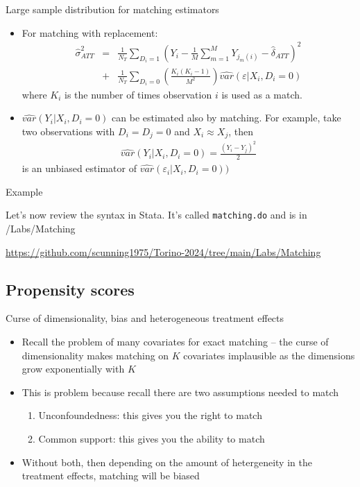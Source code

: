 \documentclass{beamer}
\begin{document}
\begin{frame}{Large sample distribution for matching estimators}
	
	\begin{itemize}
	\item For matching with replacement:
		\begin{eqnarray*}
		\widehat{\sigma}^2_{ATT} &=& \frac{1}{N_T} \sum_{D_i=1} \left( Y_i - \frac{1}{M} \sum_{m=1}^M Y_{j_m(i)} - \widehat{\delta}_{ATT} \right)^2 \\
		&+& \frac{1}{N_T} \sum_{D_i=0} \left( \frac{K_i(K_i-1)}{M^2} \right) \widehat{var}(\varepsilon | X_i,D_i=0)
		\end{eqnarray*}where $K_i$ is the number of times observation $i$ is used as a match.
	\item $\widehat{var}(Y_i | X_i,D_i=0)$ can be estimated also by matching.  For example, take two observations with $D_i=D_j=0$ and $X_i \approx X_j$, then
		\begin{eqnarray*}
		\widehat{var}(Y_i | X_i,D_i=0) = \frac{(Y_i-Y_j)^2}{2}
		\end{eqnarray*}is an unbiased estimator of $\widehat{var}(\varepsilon_i | X_i,D_i=0))$
	\end{itemize}
\end{frame}

\begin{frame}{Example}

Let's now review the syntax in Stata.  It's called \texttt{matching.do} and is in /Labs/Matching 

\bigskip

\url{https://github.com/scunning1975/Torino-2024/tree/main/Labs/Matching}

\end{frame}


\subsection{Propensity scores}


\begin{frame}{Curse of dimensionality, bias and heterogeneous treatment effects}
	
	\begin{itemize}
	\item Recall the problem of many covariates for exact matching -- the curse of dimensionality makes matching on $K$ covariates implausible as the dimensions grow exponentially with $K$ 
	\item This is problem because recall there are two assumptions needed to match
		\begin{enumerate}
		\item Unconfoundedness: this gives you the right to match
		\item Common support: this gives you the ability to match
		\end{enumerate}
	\item Without both, then depending on the amount of hetergeneity in the treatment effects, matching will be biased
	\end{itemize}

\end{frame}
\end{document}
